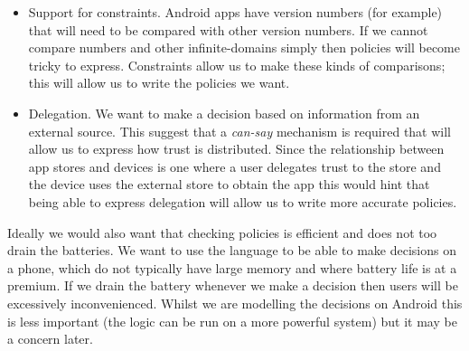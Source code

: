 \documentclass[a4paper]{article}
\begin{document}
\begin{itemize}
  \item Support for constraints.  Android apps have version numbers (for
    example) that will need to be compared with other version numbers.  If we
    cannot compare numbers and other infinite-domains simply then policies will
    become tricky to express.  Constraints allow us to make these kinds of
    comparisons; this will allow us to write the policies we want.

  \item Delegation.  We want to make a decision based on information from an
    external source.  This suggest that a \emph{can-say} mechanism is required
    that will allow us to express how trust is distributed.   Since the
    relationship between app stores and devices is one where a user delegates
    trust to the store and the device uses the external store to obtain the app
    this would hint that being able to express delegation will allow us to write
    more accurate policies.

\end{itemize}
    
Ideally we would also want that checking policies is efficient and does not too
drain the batteries.  We want to use the language to be able to make decisions
on a phone, which do not typically have large memory and where battery life is
at a premium.  If we drain the battery whenever we make a decision then users
will be excessively inconvenienced.  Whilst we are modelling the decisions on
Android this is less important (the logic can be run on a more powerful system)
but it may be a concern later.

\end{document}
